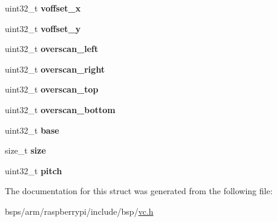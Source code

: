 \begin{DoxyCompactItemize}
\mbox{\label{structbcm2835__init__frame__buffer__entries_a40abff75e518fe77b4bc4a76cd7f0489}} 
uint32\+\_\+t {\bfseries voffset\+\_\+x}
\item 
\mbox{\label{structbcm2835__init__frame__buffer__entries_ae3254f2db158dde803e6a589f1706e4e}} 
uint32\+\_\+t {\bfseries voffset\+\_\+y}
\item 
\mbox{\label{structbcm2835__init__frame__buffer__entries_a0b2bfa7cc13f41572bb6b6dc1fedec72}} 
uint32\+\_\+t {\bfseries overscan\+\_\+left}
\item 
\mbox{\label{structbcm2835__init__frame__buffer__entries_a77121e17f77780a7b0cd728a93863193}} 
uint32\+\_\+t {\bfseries overscan\+\_\+right}
\item 
\mbox{\label{structbcm2835__init__frame__buffer__entries_af7bd3ca985076946f5cb6112b55fe88a}} 
uint32\+\_\+t {\bfseries overscan\+\_\+top}
\item 
\mbox{\label{structbcm2835__init__frame__buffer__entries_ade08986f7d40a9f7a5f6f240ef735e78}} 
uint32\+\_\+t {\bfseries overscan\+\_\+bottom}
\item 
\mbox{\label{structbcm2835__init__frame__buffer__entries_a59ef25dcea5557300e0ca02824668145}} 
uint32\+\_\+t {\bfseries base}
\item 
\mbox{\label{structbcm2835__init__frame__buffer__entries_add26eef1cdddff9482bc2c1032af7f27}} 
size\+\_\+t {\bfseries size}
\item 
\mbox{\label{structbcm2835__init__frame__buffer__entries_ade386d33e5b3ffc8d6569d0536c2908c}} 
uint32\+\_\+t {\bfseries pitch}
\end{DoxyCompactItemize}


The documentation for this struct was generated from the following file\+:\begin{DoxyCompactItemize}
\item 
bsps/arm/raspberrypi/include/bsp/\mbox{\hyperlink{vc_8h}{vc.\+h}}\end{DoxyCompactItemize}
